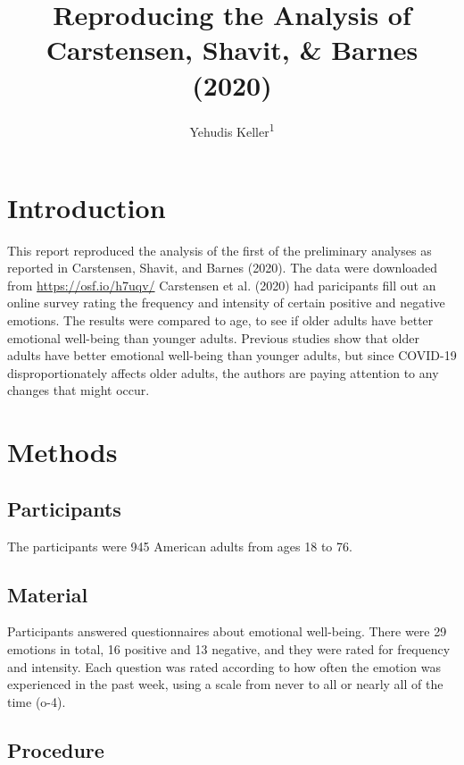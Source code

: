 \documentclass[
  english,
  man]{apa6}
\title{Reproducing the Analysis of Carstensen, Shavit, \& Barnes (2020)}
\author{Yehudis Keller\textsuperscript{1}}
\date{}
\affiliation{\vspace{0.5cm}\textsuperscript{1} Brooklyn College of the City University of New York}
\begin{document}
\maketitle

\hypertarget{introduction}{%
\section{Introduction}\label{introduction}}

This report reproduced the analysis of the first of the preliminary analyses as reported in Carstensen, Shavit, and Barnes (2020). The data were downloaded from \url{https://osf.io/h7uqv/} Carstensen et al. (2020) had paricipants fill out an online survey rating the frequency and intensity of certain positive and negative emotions. The results were compared to age, to see if older adults have better emotional well-being than younger adults. Previous studies show that older adults have better emotional well-being than younger adults, but since COVID-19 disproportionately affects older adults, the authors are paying attention to any changes that might occur.

\hypertarget{methods}{%
\section{Methods}\label{methods}}

\hypertarget{participants}{%
\subsection{Participants}\label{participants}}

The participants were 945 American adults from ages 18 to 76.

\hypertarget{material}{%
\subsection{Material}\label{material}}

Participants answered questionnaires about emotional well-being. There were 29 emotions in total, 16 positive and 13 negative, and they were rated for frequency and intensity. Each question was rated according to how often the emotion was experienced in the past week, using a scale from never to all or nearly all of the time (o-4).

\hypertarget{procedure}{%
\subsection{Procedure}\label{procedure}}
\end{document}
